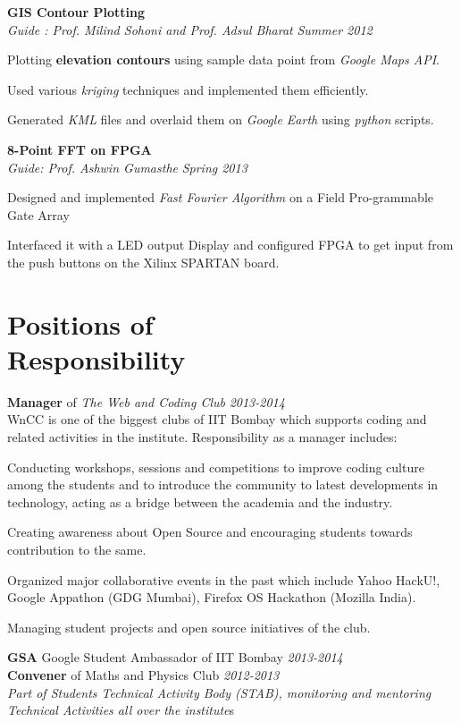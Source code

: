 \documentclass[margin,11pt]{resume}
\begin{document}
\begin{resume}
\textbf{GIS Contour Plotting}\\
  \textsl{Guide : Prof. Milind Sohoni and Prof. Adsul Bharat} \hfill \emph{Summer 2012}
\begin{list2}
\item Plotting \textbf{elevation contours} using sample data point from \emph{Google Maps API}.
\item Used various \emph{kriging} techniques and implemented them efficiently.
\item Generated \emph{KML} files and overlaid them on \emph{Google Earth} using \emph{python} scripts. \\
\end{list2}

\textbf{8-Point FFT on FPGA}\\ \textsl{Guide: Prof. Ashwin Gumasthe} \hfill \emph{Spring 2013}
\begin{list2}
\item Designed and implemented \emph{Fast Fourier Algorithm} on a Field Pro-grammable Gate Array 
\item Interfaced it with a LED output Display and configured FPGA to get input from the push buttons on the Xilinx SPARTAN board.
\end{list2}



\section{\mysidestyle Positions of\\Responsibility } 


\textbf{Manager} of \emph{The Web and Coding Club} \hfill \emph{2013-2014}\\
WnCC is one of the biggest clubs of IIT Bombay which supports coding and related activities in the institute. Responsibility as a manager includes:
\begin{list2}
\item Conducting workshops, sessions and competitions to improve coding culture among the students and to introduce the community to latest developments in technology, acting as a bridge between the academia and the industry. 
\item Creating awareness about Open Source and encouraging students towards contribution to the same. 
\item Organized major collaborative events in the past which include Yahoo HackU!, Google Appathon (GDG Mumbai), Firefox OS Hackathon (Mozilla India). 
\item Managing student projects and open source initiatives of the club. 
\end{list2}
\textbf{GSA} Google Student Ambassador of IIT Bombay \hfill \emph{2013-2014} \\
\textbf{Convener} of Maths and Physics Club \hfill \emph{2012-2013} \\
\emph{Part of Students Technical Activity Body (STAB), monitoring and mentoring Technical Activities all over the institute}s


\end{resume}
\end{document}
